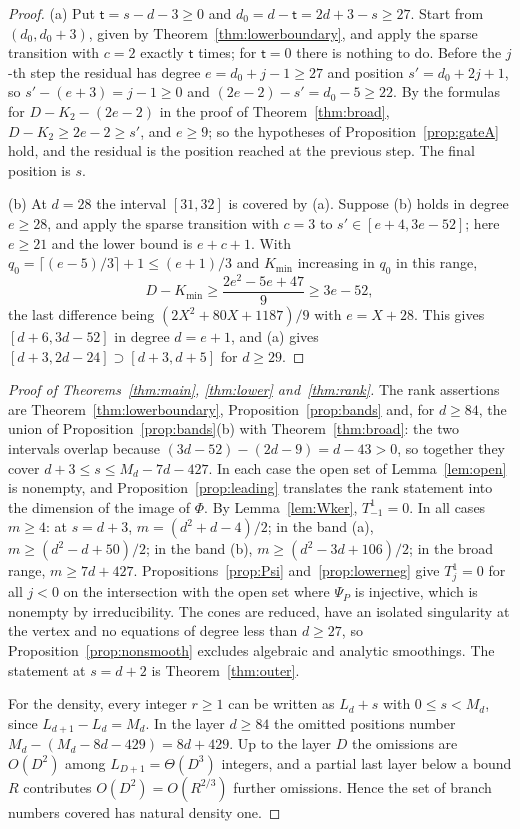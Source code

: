 \documentclass{amsart}
\theoremstyle{definition}
\theoremstyle{remark}
\numberwithin{equation}{section}
\begin{document}
\begin{proof}
(a) Put $\mathsf t=s-d-3\ge0$ and $d_0=d-\mathsf t=2d+3-s\ge27$. Start from
$(d_0,d_0+3)$, given by Theorem~\ref{thm:lowerboundary}, and apply the sparse transition
with $c=2$ exactly $\mathsf t$ times; for $\mathsf t=0$ there is nothing to do. Before the
$j$-th step the residual has degree $e=d_0+j-1\ge27$ and position $s'=d_0+2j+1$, so
$s'-(e+3)=j-1\ge0$ and $(2e-2)-s'=d_0-5\ge22$. By the formulas for $D-K_2-(2e-2)$ in the
proof of Theorem~\ref{thm:broad}, $D-K_2\ge2e-2\ge s'$, and $e\ge9$; so the hypotheses
of Proposition~\ref{prop:gateA} hold, and the residual is the position reached at the
previous step. The final position is $s$.

(b) At $d=28$ the interval $[31,32]$ is covered by (a). Suppose (b) holds in degree
$e\ge28$, and apply the sparse transition with $c=3$ to $s'\in[e+4,3e-52]$; here
$e\ge21$ and the lower bound is $e+c+1$. With $q_0=\lceil(e-5)/3\rceil+1\le(e+1)/3$ and
$K_{\min}$ increasing in $q_0$ in this range,
\[
  D-K_{\min}\ge\frac{2e^2-5e+47}9\ge3e-52,
\]
the last difference being $(2X^2+80X+1187)/9$ with $e=X+28$. This gives
$[d+6,3d-52]$ in degree $d=e+1$, and (a) gives $[d+3,2d-24]\supset[d+3,d+5]$ for $d\ge29$.
\end{proof}

\begin{proof}[Proof of Theorems~\ref{thm:main}, \ref{thm:lower} and~\ref{thm:rank}]
The rank assertions are Theorem~\ref{thm:lowerboundary}, Proposition~\ref{prop:bands}
and, for $d\ge84$, the union of Proposition~\ref{prop:bands}(b) with
Theorem~\ref{thm:broad}: the two intervals overlap because $(3d-52)-(2d-9)=d-43>0$, so
together they cover $d+3\le s\le M_d-7d-427$. In each case the open set of
Lemma~\ref{lem:open} is nonempty, and Proposition~\ref{prop:leading} translates the
rank statement into the dimension of the image of $\Phi$. By Lemma~\ref{lem:Wker},
$T^1_{-1}=0$. In all cases $m\ge4$: at $s=d+3$, $m=(d^2+d-4)/2$; in the band
(a), $m\ge(d^2-d+50)/2$; in the band (b), $m\ge(d^2-3d+106)/2$; in the broad range,
$m\ge7d+427$. Propositions~\ref{prop:Psi} and~\ref{prop:lowerneg} give $T^1_j=0$ for all
$j<0$ on the intersection with the open set where $\Psi_P$ is injective, which is
nonempty by irreducibility. The cones are reduced, have an isolated singularity at the
vertex and no equations of degree less than $d\ge27$, so
Proposition~\ref{prop:nonsmooth} excludes algebraic and analytic smoothings. The
statement at $s=d+2$ is Theorem~\ref{thm:outer}.

For the density, every integer $r\ge1$ can be written as $L_d+s$ with $0\le s<M_d$, since
$L_{d+1}-L_d=M_d$. In the layer $d\ge84$ the omitted positions number
$M_d-(M_d-8d-429)=8d+429$. Up to the layer $D$ the omissions are $O(D^2)$ among
$L_{D+1}=\Theta(D^3)$ integers, and a partial last layer below a bound $R$ contributes
$O(D^2)=O(R^{2/3})$ further omissions. Hence the set of branch numbers covered has
natural density one.
\end{proof}
\end{document}
